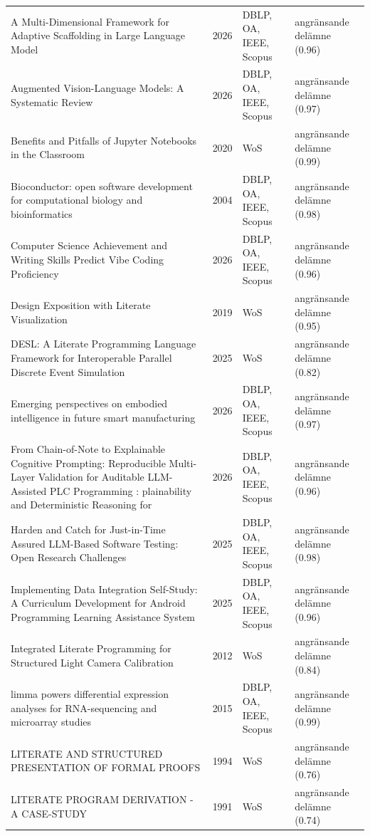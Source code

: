 \begin{longtable}{@{}%
  >{\raggedright\arraybackslash}p{}c%
  >{\raggedright\arraybackslash}p{}%
  >{\raggedright\arraybackslash}p{}@{}}
A Multi-Dimensional Framework for Adaptive Scaffolding in Large Language Model & 2026 & DBLP, OA, IEEE, Scopus & angränsande delämne (0.96) \\
Augmented Vision-Language Models: A Systematic Review & 2026 & DBLP, OA, IEEE, Scopus & angränsande delämne (0.97) \\
Benefits and Pitfalls of Jupyter Notebooks in the Classroom & 2020 & WoS & angränsande delämne (0.99) \\
Bioconductor: open software development for computational biology and bioinformatics & 2004 & DBLP, OA, IEEE, Scopus & angränsande delämne (0.98) \\
Computer Science Achievement and Writing Skills Predict Vibe Coding Proficiency & 2026 & DBLP, OA, IEEE, Scopus & angränsande delämne (0.96) \\
Design Exposition with Literate Visualization & 2019 & WoS & angränsande delämne (0.95) \\
DESL: A Literate Programming Language Framework for Interoperable Parallel Discrete Event Simulation & 2025 & WoS & angränsande delämne (0.82) \\
Emerging perspectives on embodied intelligence in future smart manufacturing & 2026 & DBLP, OA, IEEE, Scopus & angränsande delämne (0.97) \\
From Chain-of-Note to Explainable Cognitive Prompting: Reproducible Multi-Layer Validation for Auditable LLM-Assisted PLC Programming : plainability and Deterministic Reasoning for & 2026 & DBLP, OA, IEEE, Scopus & angränsande delämne (0.96) \\
Harden and Catch for Just-in-Time Assured LLM-Based Software Testing: Open Research Challenges & 2025 & DBLP, OA, IEEE, Scopus & angränsande delämne (0.98) \\
Implementing Data Integration Self-Study: A Curriculum Development for Android Programming Learning Assistance System & 2025 & DBLP, OA, IEEE, Scopus & angränsande delämne (0.96) \\
Integrated Literate Programming for Structured Light Camera Calibration & 2012 & WoS & angränsande delämne (0.84) \\
limma powers differential expression analyses for RNA-sequencing and microarray studies & 2015 & DBLP, OA, IEEE, Scopus & angränsande delämne (0.99) \\
LITERATE AND STRUCTURED PRESENTATION OF FORMAL PROOFS & 1994 & WoS & angränsande delämne (0.76) \\
LITERATE PROGRAM DERIVATION - A CASE-STUDY & 1991 & WoS & angränsande delämne (0.74) \\

\end{longtable}
